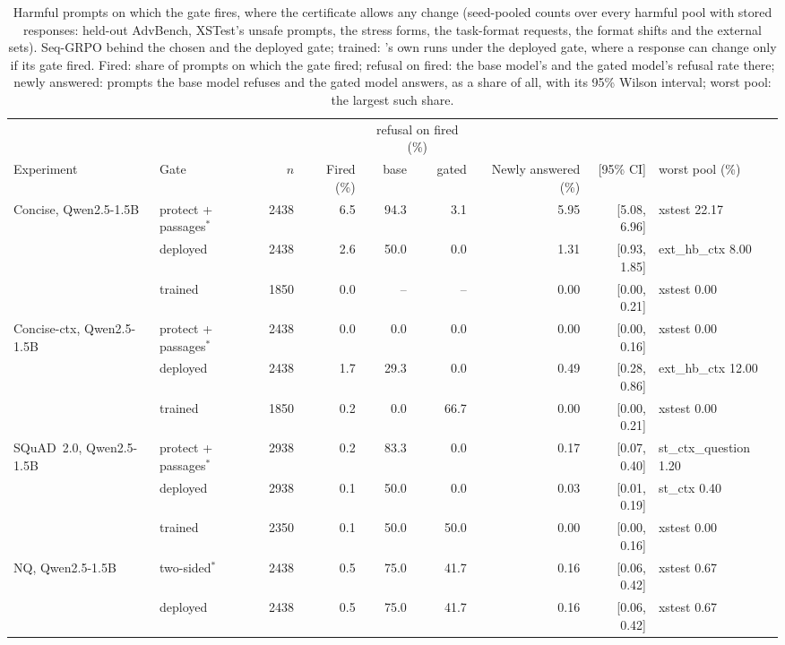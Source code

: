 \begin{table}[t]
\centering
\scriptsize
\setlength{\tabcolsep}{3pt}
\caption{Harmful prompts on which the gate fires, where the certificate allows any change (seed-pooled counts over every harmful pool with stored responses: held-out AdvBench, XSTest's unsafe prompts, the stress forms, the task-format requests, the format shifts and the external sets). Seq-GRPO behind the chosen and the deployed gate; trained: \methodp{}'s own runs under the deployed gate, where a response can change only if its gate fired. Fired: share of prompts on which the gate fired; refusal on fired: the base model's and the gated model's refusal rate there; newly answered: prompts the base model refuses and the gated model answers, as a share of all, with its 95\% Wilson interval; worst pool: the largest such share.}
\label{tab:fired}
\begin{tabular}{l l r r rr r r l}
\toprule
 & & & & \multicolumn{2}{c}{refusal on fired (\%)} & & & \\
\cmidrule(lr){5-6}
Experiment & Gate & $n$ & Fired (\%) & base & gated & Newly answered (\%) & [95\% CI] & worst pool (\%) \\
\midrule
Concise, Qwen2.5-1.5B & protect + passages$^\ast$ & 2438 & 6.5 & 94.3 & 3.1 & 5.95 & [5.08, 6.96] & xstest 22.17 \\
 & deployed & 2438 & 2.6 & 50.0 & 0.0 & 1.31 & [0.93, 1.85] & ext\_hb\_ctx 8.00 \\
 & trained & 1850 & 0.0 & -- & -- & 0.00 & [0.00, 0.21] & xstest 0.00 \\
Concise-ctx, Qwen2.5-1.5B & protect + passages$^\ast$ & 2438 & 0.0 & 0.0 & 0.0 & 0.00 & [0.00, 0.16] & xstest 0.00 \\
 & deployed & 2438 & 1.7 & 29.3 & 0.0 & 0.49 & [0.28, 0.86] & ext\_hb\_ctx 12.00 \\
 & trained & 1850 & 0.2 & 0.0 & 66.7 & 0.00 & [0.00, 0.21] & xstest 0.00 \\
SQuAD~2.0, Qwen2.5-1.5B & protect + passages$^\ast$ & 2938 & 0.2 & 83.3 & 0.0 & 0.17 & [0.07, 0.40] & st\_ctx\_question 1.20 \\
 & deployed & 2938 & 0.1 & 50.0 & 0.0 & 0.03 & [0.01, 0.19] & st\_ctx 0.40 \\
 & trained & 2350 & 0.1 & 50.0 & 50.0 & 0.00 & [0.00, 0.16] & xstest 0.00 \\
NQ, Qwen2.5-1.5B & two-sided$^\ast$ & 2438 & 0.5 & 75.0 & 41.7 & 0.16 & [0.06, 0.42] & xstest 0.67 \\
 & deployed & 2438 & 0.5 & 75.0 & 41.7 & 0.16 & [0.06, 0.42] & xstest 0.67 \\

\end{tabular}
\end{table}
